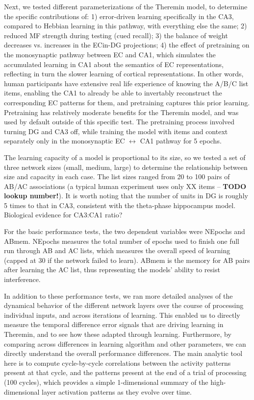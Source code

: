 \documentclass[11pt,twoside]{article}
\newif\myifpdf
\begin{document}
Next, we tested different parameterizations of the Theremin model, to determine the specific contributions of: 1) error-driven learning specifically in the CA3, compared to Hebbian learning in this pathway, with everything else the same; 2) reduced MF strength during testing (cued recall); 3) the balance of weight decreases vs. increases in the ECin-DG projections; 4) the effect of pretraining on the monosynaptic pathway between EC and CA1, which simulates the accumulated learning in CA1 about the semantics of EC representations, reflecting in turn the slower learning of cortical representations. In other words, human participants have extensive real life experience of knowing the A/B/C list items, enabling the CA1 to already be able to invertably reconstruct the corresponding EC patterns for them, and pretraining captures this prior learning.  Pretraining has relatively moderate benefits for the Theremin model, and was used by default outside of this specific test.  The pretraining process involved turning DG and CA3 off, while training the model with items and context separately only in the monosynaptic EC $\leftrightarrow$ CA1 pathway for 5 epochs. 

The learning capacity of a model is proportional to its size, so we tested a set of three network sizes (small, medium, large) to determine the relationship between size and capacity in each case.  The list sizes ranged from 20 to 100 pairs of AB/AC associations (a typical human experiment uses only XX items -- \textbf{TODO lookup number!}). It is worth noting that the number of units in DG is roughly 5 times to that in CA3, consistent with the theta-phase hippocampus model. Biological evidence for CA3:CA1 ratio?

For the basic performance tests, the two dependent variables were NEpochs and ABmem.  NEpochs measures the total number of epochs used to finish one full run through AB and AC lists, which measures the overall speed of learning (capped at 30 if the network failed to learn). ABmem is the memory for AB pairs after learning the AC list, thus representing the models' ability to resist interference.

In addition to these performance tests, we ran more detailed analyses of the dynamical behavior of the different network layers over the course of processing individual inputs, and across iterations of learning.  This enabled us to directly measure the temporal difference error signals that are driving learning in Theremin, and to see how these adapted through learning.  Furthermore, by comparing across differences in learning algorithm and other parameters, we can directly understand the overall performance differences.  The main analytic tool here is to compute cycle-by-cycle correlations between the activity patterns present at that cycle, and the patterns present at the end of a trial of processing (100 cycles), which provides a simple 1-dimensional summary of the high-dimensional layer activation patterns as they evolve over time.
\end{document}
